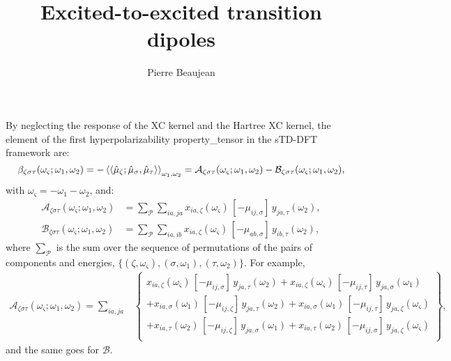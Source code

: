 \documentclass[11pt,a4paper]{article}
\title{Excited-to-excited transition dipoles}
\author{Pierre Beaujean}
\begin{document}
\maketitle

By neglecting the response of the XC kernel and the Hartree XC kernel, the element of the first hyperpolarizability property_tensor in the sTD-DFT framework are: \cite{deWergifosse2018NLObeta}
\begin{equation}
\beta_{\zeta\sigma\tau}(\omega_\varsigma;\omega_1,\omega_2) = -\braket{\braket{\hat\mu_\zeta;\hat\mu_\sigma,\hat\mu_\tau}}_{\omega_1,\omega_2} = \mathcal A_{\zeta\sigma\tau}(\omega_\varsigma;\omega_1,\omega_2) - \mathcal B_{\zeta\sigma\tau}(\omega_\varsigma;\omega_1,\omega_2), \label{eq:beta}
\end{equation}
with $\omega_\varsigma = -\omega_1 - \omega_2$, and:
\begin{align}
	\mathcal A_{\zeta\sigma\tau}(\omega_\varsigma;\omega_1,\omega_2) &= \sum_{\mathcal P} \sum_{ia,ja} x_{ia,\zeta}(\omega_\varsigma)\,[-\mu_{ij,\sigma}]\,y_{ja,\tau}(\omega_2), \label{eq:A}\\
	\mathcal B_{\zeta\sigma\tau}(\omega_\varsigma;\omega_1,\omega_2) &= \sum_{\mathcal P} \sum_{ia,ib} x_{ia,\zeta}(\omega_\varsigma)\,[-\mu_{ab,\sigma}]\,y_{ib,\tau}(\omega_2), \label{eq:B}
\end{align}
where $\sum_{\mathcal P}$ is the sum over the sequence of permutations of the pairs of components and energies, $\{(\zeta,\omega_\varsigma), (\sigma, \omega_1), (\tau,\omega_2)\}$. For example,
	\begin{align*}
	\mathcal A_{\zeta\sigma\tau}(\omega_\varsigma;\omega_1,\omega_2) = \sum_{ia,ja}& \left\{\begin{array}{l}
		x_{ia,\zeta}(\omega_\varsigma)\,[-\mu_{ij,\sigma}]\,y_{ja,\tau}(\omega_2) + x_{ia,\zeta}(\omega_\varsigma)\,[-\mu_{ij,\tau}]\,y_{ja,\sigma}(\omega_1)\\
		+x_{ia,\sigma}(\omega_1)\,[-\mu_{ij,\zeta}]\,y_{ja,\tau}(\omega_2) + x_{ia,\sigma}(\omega_1)\,[-\mu_{ij,\tau}]\,y_{ja,\zeta}(\omega_\varsigma) \\
		+x_{ia,\tau}(\omega_2)\,[-\mu_{ij,\zeta}]\,y_{ja,\sigma}(\omega_1) + x_{ia,\tau}(\omega_2)\,[-\mu_{ij,\sigma}]\,y_{ja,\zeta}(\omega_\varsigma)\\
	\end{array}\right\},
\end{align*}
and the same goes for $\mathcal B$.
\end{document}
